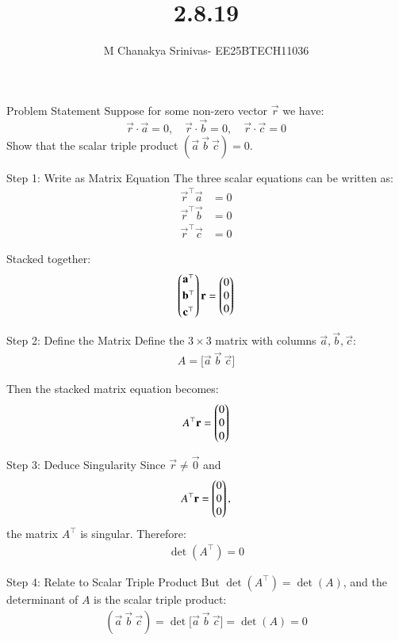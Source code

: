 \documentclass{beamer}
\title %
{2.8.19}
\date{}
\author %
{M Chanakya Srinivas- EE25BTECH11036}
\begin{document}
\frame{\titlepage}




\begin{frame}{Problem Statement}
Suppose for some non-zero vector $\vec r$ we have:
\[
\vec r \cdot \vec a = 0,\quad
\vec r \cdot \vec b = 0,\quad
\vec r \cdot \vec c = 0
\]
Show that the scalar triple product $(\vec a\ \vec b\ \vec c) = 0$.
\end{frame}

\begin{frame}{Step 1: Write as Matrix Equation}
The three scalar equations can be written as:
\begin{align}
\vec r^\top \vec a &= 0 \\
\vec r^\top \vec b &= 0 \\
\vec r^\top \vec c &= 0
\end{align}

Stacked together:
\begin{align}
\begin{pmatrix}
\mathbf a^\top \\[1mm]
\mathbf b^\top \\[1mm]
\mathbf c^\top
\end{pmatrix} \mathbf r = \begin{pmatrix}0\\0\\0\end{pmatrix}
\end{align}
\end{frame}

\begin{frame}{Step 2: Define the Matrix}
Define the \(3\times 3\) matrix with columns $\vec a,\vec b,\vec c$:
\begin{align}
A = \big[\vec a\ \vec b\ \vec c\big]
\end{align}

Then the stacked matrix equation becomes:
\begin{align}
A^\top \mathbf r = \begin{pmatrix}0\\0\\0\end{pmatrix}
\end{align}
\end{frame}

\begin{frame}{Step 3: Deduce Singularity}
Since $\vec r \neq \vec 0$ and 
\[
A^\top \mathbf r = \begin{pmatrix}0\\0\\0\end{pmatrix},
\] 
the matrix $A^\top$ is singular. Therefore:
\begin{align}
\det(A^\top) = 0
\end{align}
\end{frame}

\begin{frame}{Step 4: Relate to Scalar Triple Product}
But $\det(A^\top) = \det(A)$, and the determinant of $A$ is the scalar triple product:
\begin{align}
(\vec a\ \vec b\ \vec c) = \det\big[\vec a\ \vec b\ \vec c\big] = \det(A) = 0
\end{align}
\end{frame}
\end{document}

